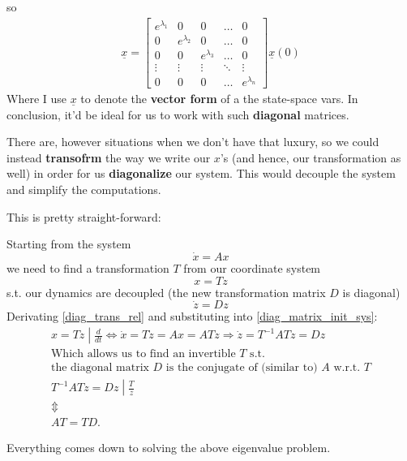 so
\begin{align*}
  \underline{x} =
  \begin{bmatrix}
    e^{\lambda_1} & 0 & 0 &\dots & 0 \\
    0 & e^{\lambda_2} & 0 & \dots & 0 \\
    0 & 0 & e^{\lambda_3} & \dots & 0 \\
    \vdots & \vdots & \vdots & \ddots & \vdots \\
    0 & 0 & 0 & \dots & e^{\lambda_n}
  \end{bmatrix}
  \underline{x}(0)
\end{align*}
Where I use $\underline{x}$ to denote the \textbf{vector form} of a the state-space vars.
In conclusion, it'd be ideal for us to work with such \textbf{diagonal} matrices.

There are, however situations when we don't have that luxury, so we could instead \textbf{transofrm} the way we write our $x$'s (and hence, our transformation as well) in order for us \textbf{diagonalize} our system. This would decouple the system and simplify the computations.

This is pretty straight-forward:

Starting from the system
\begin{equation}\label{diag_matrix_init_sys}
  \dot{x} = A x
\end{equation}
we need to find a transformation $T$ from our coordinate system
\begin{equation}\label{diag_trans_rel}
  x = Tz
\end{equation}
s.t. our dynamics are decoupled (the new transformation matrix $D$ is diagonal)
\[
  \dot{z} = Dz
\]
Derivating \ref{diag_trans_rel} and substituting into \ref{diag_matrix_init_sys}:
\begin{gather*}
  \left. x = Tz \middle| \frac{d}{dt} \right. \iff
  \dot{x} = T\dot{z} = Ax = ATz \Rightarrow \dot{z} = T^{-1} A T z = Dz \\
  \text{Which allows us to find an invertible } T \text{ s.t.} \\
  \text{the diagonal matrix } D \text{ is the conjugate of (similar to) } A \text{ w.r.t. } T \\
  \left. T^{-1} A T z = Dz \middle| \frac{T}{z}
  \right. \\
  \Updownarrow \\
  A T = T D.
\end{gather*}

Everything comes down to solving the above eigenvalue problem.

